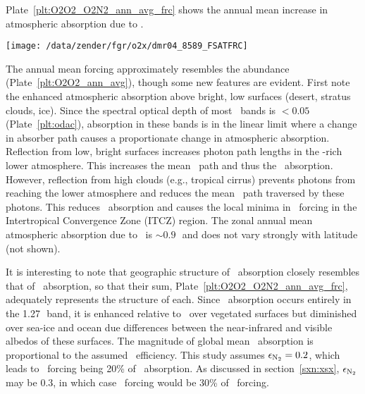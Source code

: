 \documentclass[agupp,twoside]{aguplus} %
\newlength{\fltwdtdblclm}\setlength{\fltwdtdblclm}{41.0pc} %
\begin{document}
Plate~\ref{plt:O2O2_O2N2_ann_avg_frc} shows the annual mean increase
in atmospheric absorption due to \OdX.
\begin{plate*}
\begin{center}
\texttt{[image: /data/zender/fgr/o2x/dmr04\_8589\_FSATFRC]}\vfill
\end{center}
\caption{
Annual mean increase in column atmospheric absorption (\wxmS) due to
\OdX.
\label{plt:O2O2_O2N2_ann_avg_frc}}   
\end{plate*}
The annual mean forcing approximately resembles the abundance
(Plate~\ref{plt:O2O2_ann_avg}), though some new features are evident.
First note the enhanced atmospheric absorption above bright, low
surfaces (desert, stratus clouds, ice). 
Since the spectral optical depth of most \OdX\ bands is $< 0.05$
(Plate~\ref{plt:odac}), absorption in these bands is in the 
linear limit where a change in absorber path causes a proportionate
change in atmospheric absorption.  
Reflection from low, bright surfaces increases photon path lengths in
the \OdX-rich lower atmosphere.
This increases the mean \OdX\ path and thus the \OdX\ absorption. 
However, reflection from high clouds (e.g., tropical cirrus)
prevents photons from reaching the lower atmosphere and reduces
the mean \OdX\ path traversed by these photons.
This reduces \OdX\ absorption and causes the local minima in \OdX\
forcing in the Intertropical Convergence Zone (ITCZ) region. 
The zonal annual mean atmospheric absorption due to \OdX\ is 
$\sim 0.9$\,\wxmS\ and does not vary strongly with latitude (not
shown). 

It is interesting to note that geographic structure of \OdNd\
absorption closely resembles that of \OdOd\ absorption, so that their
sum, Plate~\ref{plt:O2O2_O2N2_ann_avg_frc}, adequately represents the
structure of each.
Since \OdNd\ absorption occurs entirely in the 1.27\,\um\ band,
it is enhanced relative to \OdOd\ over vegetated surfaces but
diminished over sea-ice and ocean due differences between the
near-infrared and visible albedos of these surfaces.
The magnitude of global mean \OdNd\ absorption is proportional to the 
assumed \Nd\ efficiency. 
This study assumes $\epsilon_{\mathrm{N}_{2}} = 0.2$, which leads to \OdNd\ forcing being
20\% of \OdOd\ absorption.
As discussed in section~\ref{sxn:xsx}, $\epsilon_{\mathrm{N}_{2}}$ may be $0.3$, in which
case \OdNd\ forcing would be 30\% of \OdOd\ forcing.   
\end{document}
